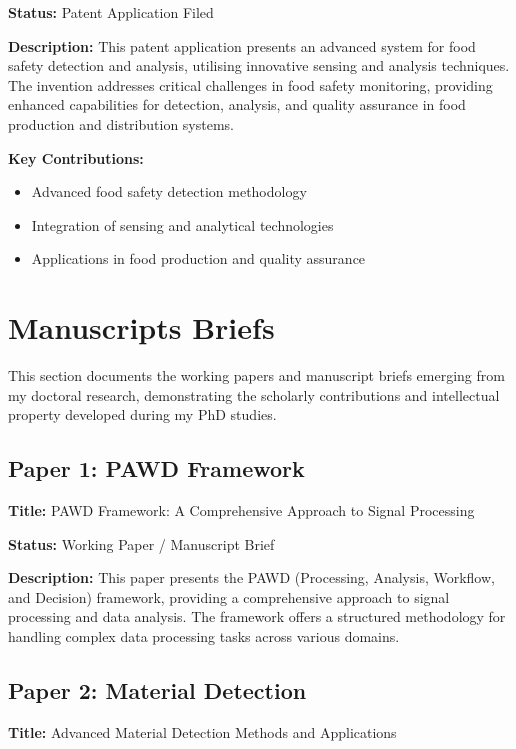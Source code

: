 \documentclass[12pt,a4paper]{article}
\begin{document}
\textbf{Status:} Patent Application Filed

\textbf{Description:} This patent application presents an advanced system for food safety detection and analysis, utilising innovative sensing and analysis techniques. The invention addresses critical challenges in food safety monitoring, providing enhanced capabilities for detection, analysis, and quality assurance in food production and distribution systems.

\textbf{Key Contributions:}
\begin{itemize}[leftmargin=*]
\item Advanced food safety detection methodology
\item Integration of sensing and analytical technologies
\item Applications in food production and quality assurance
\end{itemize}

\vspace{0.5cm}

\section{Manuscripts Briefs}

This section documents the working papers and manuscript briefs emerging from my doctoral research, demonstrating the scholarly contributions and intellectual property developed during my PhD studies.

\subsection{Paper 1: PAWD Framework}

\textbf{Title:} PAWD Framework: A Comprehensive Approach to Signal Processing

\textbf{Status:} Working Paper / Manuscript Brief

\textbf{Description:} This paper presents the PAWD (Processing, Analysis, Workflow, and Decision) framework, providing a comprehensive approach to signal processing and data analysis. The framework offers a structured methodology for handling complex data processing tasks across various domains.

\subsection{Paper 2: Material Detection}

\textbf{Title:} Advanced Material Detection Methods and Applications
\end{document}
